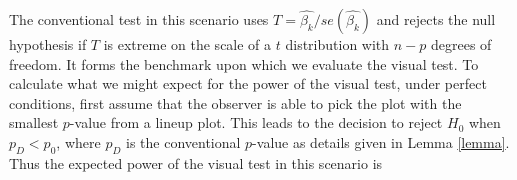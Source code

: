 \documentclass{article}
\newcommand{\red}[1]{{\color{red} #1}}
\begin{document}

The conventional test in this scenario uses $T= \hat{\beta_k}/ se(\hat{\beta_k})$ and rejects the null hypothesis if $T$ is extreme on the scale of a $t$ distribution with $n-p$ degrees of freedom.  It forms the benchmark upon which we evaluate the visual test. To calculate what we might expect for the power of the visual test, under perfect conditions, first assume that the observer is able to pick the plot with the smallest $p$-value from a lineup plot.  This leads to the decision to reject $H_0$ when $p_{D} < p_0$, where $p_{D}$ is the conventional $p$-value as details given in Lemma \ref{lemma}. Thus the expected power of the visual test in this scenario is
\end{document}
